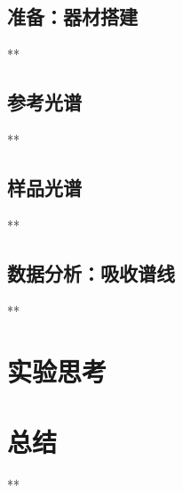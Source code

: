 \documentclass{ctexart}
\begin{document}
\subsection{准备：器材搭建}
**

\subsection{参考光谱}
**

\subsection{样品光谱}
**

\subsection{数据分析：吸收谱线}
**

\section{实验思考}

\section{总结}
**
\end{document}
